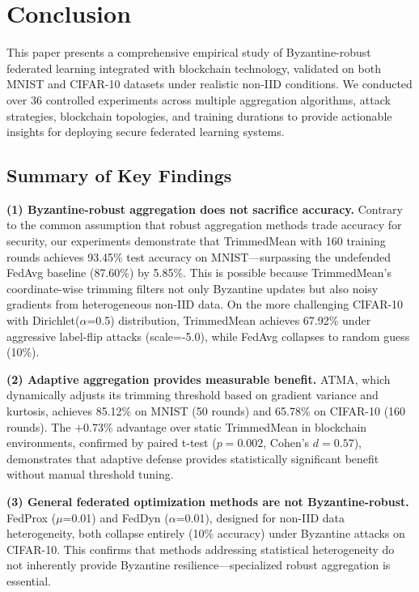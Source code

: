 \documentclass[12pt,a4paper,onecolumn]{article}
\begin{document}
\section{Conclusion}
\label{sec:conclusion}

This paper presents a comprehensive empirical study of Byzantine-robust federated learning integrated with blockchain technology, validated on both MNIST and CIFAR-10 datasets under realistic non-IID conditions. We conducted over 36 controlled experiments across multiple aggregation algorithms, attack strategies, blockchain topologies, and training durations to provide actionable insights for deploying secure federated learning systems.

\subsection{Summary of Key Findings}

\textbf{(1) Byzantine-robust aggregation does not sacrifice accuracy.} Contrary to the common assumption that robust aggregation methods trade accuracy for security, our experiments demonstrate that TrimmedMean with 160 training rounds achieves 93.45\% test accuracy on MNIST---surpassing the undefended FedAvg baseline (87.60\%) by 5.85\%. This is possible because TrimmedMean's coordinate-wise trimming filters not only Byzantine updates but also noisy gradients from heterogeneous non-IID data. On the more challenging CIFAR-10 with Dirichlet($\alpha$=0.5) distribution, TrimmedMean achieves 67.92\% under aggressive label-flip attacks (scale=-5.0), while FedAvg collapses to random guess (10\%).

\textbf{(2) Adaptive aggregation provides measurable benefit.} ATMA, which dynamically adjusts its trimming threshold based on gradient variance and kurtosis, achieves 85.12\% on MNIST (50 rounds) and 65.78\% on CIFAR-10 (160 rounds). The +0.73\% advantage over static TrimmedMean in blockchain environments, confirmed by paired t-test ($p=0.002$, Cohen's $d=0.57$), demonstrates that adaptive defense provides statistically significant benefit without manual threshold tuning.

\textbf{(3) General federated optimization methods are not Byzantine-robust.} FedProx ($\mu$=0.01) and FedDyn ($\alpha$=0.01), designed for non-IID data heterogeneity, both collapse entirely (10\% accuracy) under Byzantine attacks on CIFAR-10. This confirms that methods addressing statistical heterogeneity do not inherently provide Byzantine resilience---specialized robust aggregation is essential.
\end{document}
